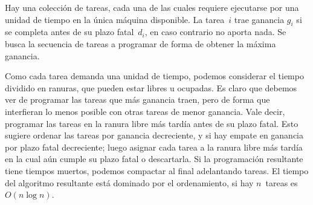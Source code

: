   Hay una colección de tareas,
  cada una de las cuales requiere ejecutarse
  por una unidad de tiempo en la única máquina disponible.
  La tarea~\(i\) trae ganancia \(g_i\)
  si se completa antes de su plazo fatal~\(d_i\),
  en caso contrario no aporta nada.
  Se busca la secuencia de tareas a programar
  de forma de obtener la máxima ganancia.

  Como cada tarea demanda una unidad de tiempo,
  podemos considerar el tiempo dividido en ranuras,
  que pueden estar libres u ocupadas.
  Es claro que debemos ver de programar las tareas que más ganancia traen,
  pero de forma que interfieran lo menos posible con otras tareas
  de menor ganancia.
  Vale decir,
  programar las tareas en la ranura libre más tardía
  antes de su plazo fatal.
  Esto sugiere ordenar las tareas por ganancia decreciente,
  y si hay empate en ganancia por plazo fatal decreciente;
  luego asignar cada tarea a la ranura libre más tardía
  en la cual aún cumple su plazo fatal o descartarla.
  Si la programación resultante tiene tiempos muertos,
  podemos compactar al final
  adelantando tareas.
  El tiempo del algoritmo resultante está dominado por el ordenamiento,
  si hay \(n\)~tareas es~\(O(n \log n)\).

